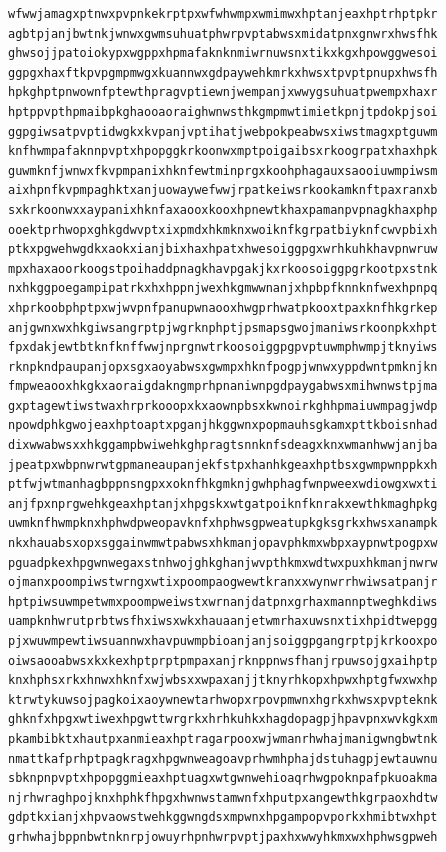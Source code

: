 \documentclass[11pt,letterpaper]{exam}
\begin{document}
\begin{questions}
\begin{verbatim}
wfwwjamagxptnwxpvpnkekrptpxwfwhwmpxwmimwxhptanjeaxhptrhptpkr
agbtpjanjbwtnkjwnwxgwmsuhuatphwrpvptabwsxmidatpnxgnwrxhwsfhk
ghwsojjpatoiokypxwgppxhpmafaknknmiwrnuwsnxtikxkgxhpowggwesoi
ggpgxhaxftkpvpgmpmwgxkuannwxgdpaywehkmrkxhwsxtpvptpnupxhwsfh
hpkghptpnwownfptewthpragvptiewnjwempanjxwwygsuhuatpwempxhaxr
hptppvpthpmaibpkghaooaoraighwnwsthkgmpmwtimietkpnjtpdokpjsoi
ggpgiwsatpvptidwgkxkvpanjvptihatjwebpokpeabwsxiwstmagxptguwm
knfhwmpafaknnpvptxhpopggkrkoonwxmptpoigaibsxrkoogrpatxhaxhpk
guwmknfjwnwxfkvpmpanixhknfewtminprgxkoohphagauxsaooiuwmpiwsm
aixhpnfkvpmpaghktxanjuowaywefwwjrpatkeiwsrkookamknftpaxranxb
sxkrkoonwxxaypanixhknfaxaooxkooxhpnewtkhaxpamanpvpnagkhaxphp
ooektprhwopxghkgdwvptxixpmdxhkmknxwoiknfkgrpatbiyknfcwvpbixh
ptkxpgwehwgdkxaokxianjbixhaxhpatxhwesoiggpgxwrhkuhkhavpnwruw
mpxhaxaoorkoogstpoihaddpnagkhavpgakjkxrkoosoiggpgrkootpxstnk
nxhkggpoegampipatrkxhxhppnjwexhkgmwwnanjxhpbpfknnknfwexhpnpq
xhprkoobphptpxwjwvpnfpanupwnaooxhwgprhwatpkooxtpaxknfhkgrkep
anjgwnxwxhkgiwsangrptpjwgrknphptjpsmapsgwojmaniwsrkoonpkxhpt
fpxdakjewtbtknfknffwwjnprgnwtrkoosoiggpgpvptuwmphwmpjtknyiws
rknpkndpaupanjopxsgxaoyabwsxgwmpxhknfpogpjwnwxyppdwntpmknjkn
fmpweaooxhkgkxaoraigdakngmprhpnaniwnpgdpaygabwsxmihwnwstpjma
gxptagewtiwstwaxhrprkooopxkxaownpbsxkwnoirkghhpmaiuwmpagjwdp
npowdphkgwojeaxhptoaptxpganjhkggwnxpopmauhsgkamxpttkboisnhad
dixwwabwsxxhkggampbwiwehkghpragtsnnknfsdeagxknxwmanhwwjanjba
jpeatpxwbpnwrwtgpmaneaupanjekfstpxhanhkgeaxhptbsxgwmpwnppkxh
ptfwjwtmanhagbppnsngpxxoknfhkgmknjgwhphagfwnpweexwdiowgxwxti
anjfpxnprgwehkgeaxhptanjxhpgskxwtgatpoiknfknrakxewthkmaghpkg
uwmknfhwmpknxhphwdpweopavknfxhphwsgpweatupkgksgrkxhwsxanampk
nkxhauabsxopxsggainwmwtpabwsxhkmanjopavphkmxwbpxaypnwtpogpxw
pguadpkexhpgwnwegaxstnhwojghkghanjwvpthkmxwdtwxpuxhkmanjnwrw
ojmanxpoompiwstwrngxwtixpoompaogwewtkranxxwynwrrhwiwsatpanjr
hptpiwsuwmpetwmxpoompweiwstxwrnanjdatpnxgrhaxmannptweghkdiws
uampknhwrutprbtwsfhxiwsxwkxhauaanjetwmrhaxuwsnxtixhpidtwepgg
pjxwuwmpewtiwsuannwxhavpuwmpbioanjanjsoiggpgangrptpjkrkooxpo
oiwsaooabwsxkxkexhptprptpmpaxanjrknppnwsfhanjrpuwsojgxaihptp
knxhphsxrkxhnwxhknfxwjwbsxxwpaxanjjtknyrhkopxhpwxhptgfwxwxhp
ktrwtykuwsojpagkoixaoywnewtarhwopxrpovpmwnxhgrkxhwsxpvpteknk
ghknfxhpgxwtiwexhpgwttwrgrkxhrhkuhkxhagdopagpjhpavpnxwvkgkxm
pkambibktxhautpxanmieaxhptragarpooxwjwmanrhwhajmanigwngbwtnk
nmattkafprhptpagkragxhpgwnweagoavprhwmhphajdstuhagpjewtauwnu
sbknpnpvptxhpopggmieaxhptuagxwtgwnwehioaqrhwgpoknpafpkuoakma
njrhwraghpojknxhphkfhpgxhwnwstamwnfxhputpxangewthkgrpaoxhdtw
gdptkxianjxhpvaowstwehkggwngdsxmpwnxhpgampopvporkxhmibtwxhpt
grhwhajbppnbwtnknrpjowuyrhpnhwrpvptjpaxhxwwyhkmxwxhphwsgpweh

\end{verbatim}
\end{questions}
\end{document}
